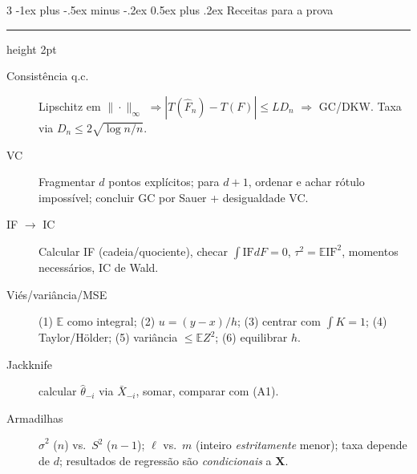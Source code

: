 \documentclass[10pt,landscape]{article}
\makeatletter
\newcommand{\E}{\mathbb{E}}
\newcommand{\IF}{\textrm{IF}}
\newcommand{\Fn}{\hat{F}_n}
\newcommand{\X}{\mathbf{X}}
\renewcommand{\section}{\@startsection{section}{1}{0mm}%
                                {-1ex plus -.5ex minus -.2ex}%
                                {0.5ex plus .2ex}%
                                {\normalfont\small\bfseries}}
\newcommand{\secrule}{\smallskip \hrule height 2pt \smallskip}
\makeatother
\begin{document}
\begin{multicols}{3}
\section{Receitas para a prova}\secrule
\begin{description}
  \item[Consistência q.c.] Lipschitz em $\|\cdot\|_\infty$ $\Rightarrow|T(\Fn)-T(F)|\le LD_n$ $\Rightarrow$ GC/DKW. Taxa via $D_n\le2\sqrt{\log n/n}$.
  \item[VC] Fragmentar $d$ pontos explícitos; para $d+1$, ordenar e achar rótulo impossível; concluir GC por Sauer + desigualdade VC.
  \item[IF $\to$ IC] Calcular IF (cadeia/quociente), checar $\int\IF dF=0$, $\tau^2=\E\IF^2$, momentos necessários, IC de Wald.
  \item[Viés/variância/MSE] (1) $\E$ como integral; (2) $u=(y-x)/h$; (3) centrar com $\int K=1$; (4) Taylor/Hölder; (5) variância $\le\E Z^2$; (6) equilibrar $h$.
  \item[Jackknife] calcular $\hat\theta_{-i}$ via $\bar X_{-i}$, somar, comparar com (A1).
  \item[Armadilhas] $\hat\sigma^2$ ($n$) vs.\ $S^2$ ($n-1$); $\ell$ vs.\ $m$ (inteiro \emph{estritamente} menor); taxa depende de $d$; resultados de regressão são \emph{condicionais} a $\X$.
\end{description}

\end{multicols}
\end{document}
